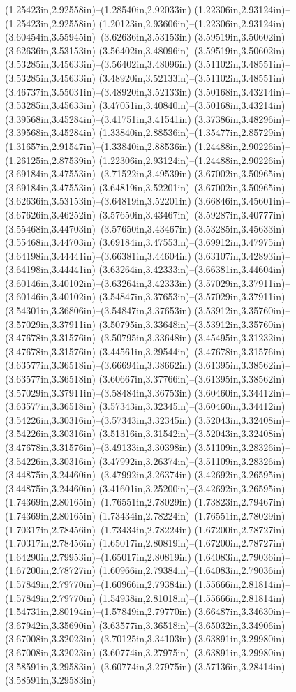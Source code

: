 (1.25423in,2.92558in)--(1.28540in,2.92033in) (1.22306in,2.93124in)--(1.25423in,2.92558in) (1.20123in,2.93606in)--(1.22306in,2.93124in) (3.60454in,3.55945in)--(3.62636in,3.53153in) (3.59519in,3.50602in)--(3.62636in,3.53153in) (3.56402in,3.48096in)--(3.59519in,3.50602in) (3.53285in,3.45633in)--(3.56402in,3.48096in) (3.51102in,3.48551in)--(3.53285in,3.45633in) (3.48920in,3.52133in)--(3.51102in,3.48551in) (3.46737in,3.55031in)--(3.48920in,3.52133in) (3.50168in,3.43214in)--(3.53285in,3.45633in) (3.47051in,3.40840in)--(3.50168in,3.43214in) (3.39568in,3.45284in)--(3.41751in,3.41541in) (3.37386in,3.48296in)--(3.39568in,3.45284in) (1.33840in,2.88536in)--(1.35477in,2.85729in) (1.31657in,2.91547in)--(1.33840in,2.88536in) (1.24488in,2.90226in)--(1.26125in,2.87539in) (1.22306in,2.93124in)--(1.24488in,2.90226in) (3.69184in,3.47553in)--(3.71522in,3.49539in) (3.67002in,3.50965in)--(3.69184in,3.47553in) (3.64819in,3.52201in)--(3.67002in,3.50965in) (3.62636in,3.53153in)--(3.64819in,3.52201in) (3.66846in,3.45601in)--(3.67626in,3.46252in) (3.57650in,3.43467in)--(3.59287in,3.40777in) (3.55468in,3.44703in)--(3.57650in,3.43467in) (3.53285in,3.45633in)--(3.55468in,3.44703in) (3.69184in,3.47553in)--(3.69912in,3.47975in) (3.64198in,3.44441in)--(3.66381in,3.44604in) (3.63107in,3.42893in)--(3.64198in,3.44441in) (3.63264in,3.42333in)--(3.66381in,3.44604in) (3.60146in,3.40102in)--(3.63264in,3.42333in) (3.57029in,3.37911in)--(3.60146in,3.40102in) (3.54847in,3.37653in)--(3.57029in,3.37911in) (3.54301in,3.36806in)--(3.54847in,3.37653in) (3.53912in,3.35760in)--(3.57029in,3.37911in) (3.50795in,3.33648in)--(3.53912in,3.35760in) (3.47678in,3.31576in)--(3.50795in,3.33648in) (3.45495in,3.31232in)--(3.47678in,3.31576in) (3.44561in,3.29544in)--(3.47678in,3.31576in) (3.63577in,3.36518in)--(3.66694in,3.38662in) (3.61395in,3.38562in)--(3.63577in,3.36518in) (3.60667in,3.37766in)--(3.61395in,3.38562in) (3.57029in,3.37911in)--(3.58484in,3.36753in) (3.60460in,3.34412in)--(3.63577in,3.36518in) (3.57343in,3.32345in)--(3.60460in,3.34412in) (3.54226in,3.30316in)--(3.57343in,3.32345in) (3.52043in,3.32408in)--(3.54226in,3.30316in) (3.51316in,3.31542in)--(3.52043in,3.32408in) (3.47678in,3.31576in)--(3.49133in,3.30398in) (3.51109in,3.28326in)--(3.54226in,3.30316in) (3.47992in,3.26374in)--(3.51109in,3.28326in) (3.44875in,3.24460in)--(3.47992in,3.26374in) (3.42692in,3.26595in)--(3.44875in,3.24460in) (3.41601in,3.25200in)--(3.42692in,3.26595in) (1.74369in,2.80165in)--(1.76551in,2.78029in) (1.73823in,2.79467in)--(1.74369in,2.80165in) (1.73434in,2.78224in)--(1.76551in,2.78029in) (1.70317in,2.78456in)--(1.73434in,2.78224in) (1.67200in,2.78727in)--(1.70317in,2.78456in) (1.65017in,2.80819in)--(1.67200in,2.78727in) (1.64290in,2.79953in)--(1.65017in,2.80819in) (1.64083in,2.79036in)--(1.67200in,2.78727in) (1.60966in,2.79384in)--(1.64083in,2.79036in) (1.57849in,2.79770in)--(1.60966in,2.79384in) (1.55666in,2.81814in)--(1.57849in,2.79770in) (1.54938in,2.81018in)--(1.55666in,2.81814in) (1.54731in,2.80194in)--(1.57849in,2.79770in) (3.66487in,3.34630in)--(3.67942in,3.35690in) (3.63577in,3.36518in)--(3.65032in,3.34906in) (3.67008in,3.32023in)--(3.70125in,3.34103in) (3.63891in,3.29980in)--(3.67008in,3.32023in) (3.60774in,3.27975in)--(3.63891in,3.29980in) (3.58591in,3.29583in)--(3.60774in,3.27975in) (3.57136in,3.28414in)--(3.58591in,3.29583in) 